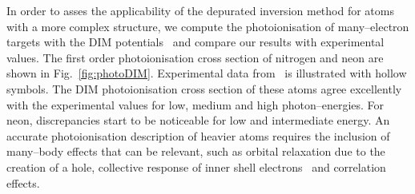\documentclass[10pt]{article}
\begin{document}
In order to asses the applicability of the depurated inversion method
for atoms with a more complex structure, we compute the 
photoionisation of many--electron targets with the DIM 
potentials~\cite{Mendez2016} and compare our results with 
experimental values. 
The first order photoionisation cross section of nitrogen and neon 
are shown in Fig.~\ref{fig:photoDIM}. Experimental data 
from~\cite{Henke1993,Samson1990,Samson2002,Stolte2016} is illustrated 
with hollow symbols. The DIM photoionisation cross section
of these atoms agree excellently with the experimental values for 
low, medium and high photon--energies. For neon, discrepancies start 
to be noticeable for low and intermediate energy. An accurate 
photoionisation description of heavier atoms requires the inclusion 
of many--body effects that can be relevant, such as orbital 
relaxation due to the creation of a hole, collective response 
of inner shell electrons~\cite{Ederer1964} and correlation effects.
\end{document}
